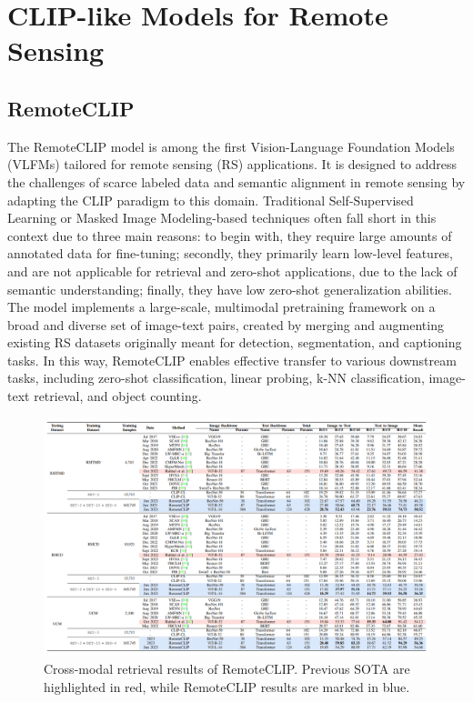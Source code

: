 \documentclass[a4paper, oneside, english]{sapthesis} %
\begin{document}
\section{CLIP-like Models for Remote Sensing}

\subsection{RemoteCLIP}

The RemoteCLIP model \cite{liu2024remoteclip} is among the first Vision-Language Foundation Models (VLFMs) tailored for remote sensing (RS) applications. It is designed to address the challenges of scarce labeled data and semantic alignment in remote sensing by adapting the CLIP paradigm to this domain. Traditional Self-Supervised Learning or Masked Image Modeling-based techniques often fall short in this context due to three main reasons: to begin with, they require large amounts of annotated data for fine-tuning; secondly, they primarily learn low-level features, and are not applicable for retrieval and zero-shot applications, due to the lack of semantic understanding; finally, they have low zero-shot generalization abilities.
The model implements a large-scale, multimodal pretraining framework on a broad and diverse set of image-text pairs, created by merging and augmenting existing RS datasets originally meant for detection, segmentation, and captioning tasks. In this way, RemoteCLIP enables effective transfer to various downstream tasks, including zero-shot classification, linear probing, k-NN classification, image-text retrieval, and object counting.

\begin{figure}[h]
    \centering
    \includegraphics[width=\textwidth]{img/remoteclip-retrieval-performance.png}
    \caption{Cross-modal retrieval results of RemoteCLIP. Previous SOTA are highlighted in red, while RemoteCLIP results are marked in blue.}
    \label{fig:remoteclip-performance}
\end{figure}
\end{document}
